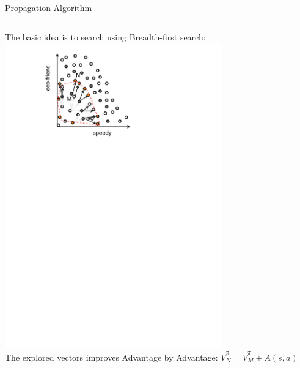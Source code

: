 \documentclass{beamer}
\newcommand\Fontvi{\fontsize{9}{10.2}\selectfont}
\begin{document}
\begin{frame}{Propagation Algorithm}
\begin{columns}

\begin{column}{.48\textwidth}
The basic idea is to search using \alert{Breadth-first search}: ~\\
\includegraphics[width=0.7\textwidth]{figures-new/domin-normal} ~\\
The explored vectors improves {\color{red}Advantage by Advantage}: $\bar{V}^{\pi}_N = \bar{V}^{\pi}_M + \bar{A}(s,a) $


\end{column}
\end{columns}
\end{frame}
\end{document}
